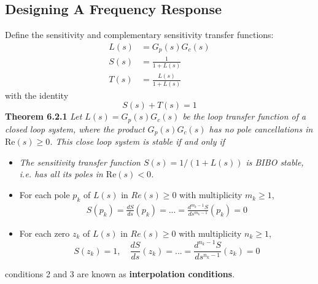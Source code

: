 \documentclass[letterpaper,12pt]{article}
\begin{document}
\subsection{Designing A Frequency Response}
Define the sensitivity and complementary sensitivity transfer functions:
\begin{align*}
    L(s) &= G_p(s) G_c(s) \\
    S(s) &= \frac{1}{1 + L(s)} \\
    T(s) &= \frac{L(s)}{1 + L(s)} 
\end{align*}
with the identity
\begin{equation*}
    S(s) + T(s) = 1
\end{equation*}
\textbf{Theorem 6.2.1} \textit{
Let $L(s) = G_p(s) G_c(s)$ be the loop transfer function of a closed loop
system, where the product $G_p(s) G_c(s)$ has no pole cancellations in $\text{Re}(s) \geq 0$. This close loop system
is stable if and only if}
\begin{itemize}
    \item \textit{The sensitivity transfer function $S(s) = 1/(1 + L(s))$ is BIBO stable, i.e. has all its poles in $\text{Re}(s) < 0$.}
    \item For each pole $p_k$ of $L(s)$ in $Re(s) \geq 0$ with multiplicity $m_k \geq 1$, 
    \begin{align*}
        S(p_k) = \frac{dS}{ds}(p_k) = ... = \frac{d^{m_k - 1}S}{ds^{m_k - 1}}(p_k) = 0
    \end{align*}
    \item For each zero $z_k$ of $L(s)$ in $Re(s) \geq 0$ with multiplicity $n_k \geq 1$,
    \[
        S(z_k) = 1, \quad \frac{dS}{ds}(z_k) = ... = \frac{d^{n_k - 1}S}{ds^{n_k - 1}}(z_k) = 0
    \]
\end{itemize}
conditions 2 and 3 are known as \textbf{interpolation conditions}.
\end{document}
